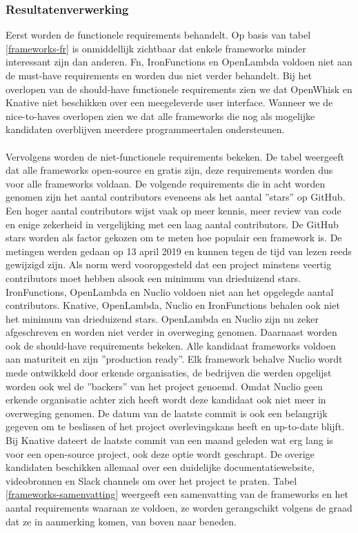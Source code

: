 \subsubsection{Resultatenverwerking}
Eerst worden de functionele requirements behandelt. Op basis van tabel \ref{frameworks-fr} is onmiddellijk zichtbaar dat enkele frameworks minder interessant zijn dan anderen. Fn, IronFunctions en OpenLambda voldoen niet aan de must-have requirements en worden dus niet verder behandelt. Bij het overlopen van de should-have functionele requirements zien we dat OpenWhisk en Knative niet beschikken over een meegeleverde user interface. Wanneer we de nice-to-haves overlopen zien we dat alle frameworks die nog als mogelijke kandidaten overblijven meerdere programmeertalen ondersteunen.
\\\\
Vervolgens worden de niet-functionele requirements bekeken. De tabel weergeeft dat alle frameworks open-source en gratis zijn, deze requirements worden dus voor alle frameworks voldaan. De volgende requirements die in acht worden genomen zijn het aantal contributors eveneens als het aantal ''stars'' op GitHub. Een hoger aantal contributors wijst vaak op meer kennis, meer review van code en enige zekerheid in vergelijking met een laag aantal contributors. De GitHub stars worden als factor gekozen om te meten hoe populair een framework is. De metingen werden gedaan op 13 april 2019 en kunnen tegen de tijd van lezen reeds gewijzigd zijn. Als norm werd vooropgesteld dat een project minstens veertig contributors moet hebben alsook een minimum van drieduizend stars. IronFunctions, OpenLambda en Nuclio voldoen niet aan het opgelegde aantal contributors. Knative, OpenLambda, Nuclio en IronFunctions behalen ook niet het minimum van drieduizend stars. OpenLambda en Nuclio zijn nu zeker afgeschreven en worden niet verder in overweging genomen. Daarnaast worden ook de should-have requirements bekeken. Alle kandidaat frameworks voldoen aan maturiteit en zijn ''production ready''. Elk framework behalve Nuclio wordt mede ontwikkeld door erkende organisaties, de bedrijven die werden opgelijst worden ook wel de ''backers'' van het project genoemd. Omdat Nuclio geen erkende organisatie achter zich heeft wordt deze kandidaat ook niet meer in overweging genomen. De datum van de laatste commit is ook een belangrijk gegeven om te beslissen of het project overlevingskans heeft en up-to-date blijft. Bij Knative dateert de laatste commit van een maand geleden wat erg lang is voor een open-source project, ook deze optie wordt geschrapt. De overige kandidaten beschikken allemaal over een duidelijke documentatiewebsite, videobronnen en Slack channels om over het project te praten. Tabel \ref{frameworks-samenvatting} weergeeft een samenvatting van de frameworks en het aantal requirements waaraan ze voldoen, ze worden gerangschikt volgens de graad dat ze in aanmerking komen, van boven naar beneden.
